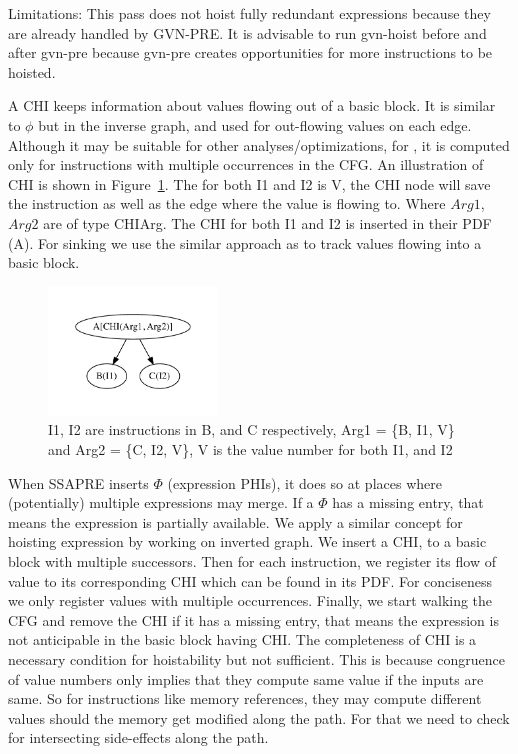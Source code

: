 \documentclass[sigplan,10pt,review,anonymous]{acmart}\settopmatter{printfolios=true,printccs=false,printacmref=false}
\begin{document}
Limitations: This pass does not hoist fully redundant expressions because they
are already handled by GVN-PRE. It is advisable to run gvn-hoist before and
after gvn-pre because gvn-pre creates opportunities for more instructions to be
hoisted.


A CHI keeps information about values flowing out of a basic block.  It is
similar to $\phi$ \cite{ssa} but in the inverse graph, and used for out-flowing
values on each edge. Although it may be suitable for other
analyses/optimizations, for \GCM{}, it is computed only for instructions with
multiple occurrences in the CFG. An illustration of CHI is shown in
Figure~\ref{fig:chi-intro}. The \GVN{} for both I1 and I2 is V, the CHI node
will save the instruction as well as the edge where the value is flowing to.
Where $Arg1$, $Arg2$ are of type CHIArg. The CHI for both I1 and I2 is
inserted in their PDF (A). For sinking we use the similar approach as
\cite{ssapre} to track values flowing into a basic block.


\begin{figure}
  \includegraphics[width=0.4\textwidth]{chi-example.pdf}
  \vspace*{-1.0cm}
\caption{I1, I2 are instructions in B, and C respectively, Arg1 = \{B, I1,
  V\} and Arg2 = \{C, I2, V\}, V is the value number for both I1, and I2}
\label{fig:chi-intro}
\end{figure}


When SSAPRE inserts $\Phi$ (expression PHIs), it does so at places where
(potentially) multiple expressions may merge. If a $\Phi$ has a missing entry,
that means the expression is partially available.  We apply a similar concept
for hoisting expression by working on inverted graph. We insert a CHI, to a
basic block with multiple successors. Then for each instruction, we register its
flow of value to its corresponding CHI which can be found in its PDF. For
conciseness we only register values with multiple occurrences. Finally, we start
walking the CFG and remove the CHI if it has a missing entry, that means the
expression is not anticipable in the basic block having CHI. The completeness of
CHI is a necessary condition for hoistability but not sufficient. This is
because congruence of value numbers only implies that they compute same value if
the inputs are same. So for instructions like memory references, they may
compute different values should the memory get modified along the path. For that
we need to check for intersecting side-effects along the path.
\end{document}
